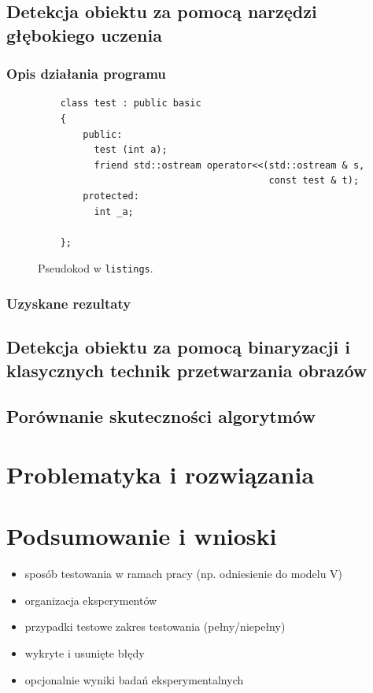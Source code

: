 \documentclass[a4paper,twoside,12pt]{book}
\begin{document}
\section{Detekcja obiektu za pomocą narzędzi głębokiego uczenia}
\subsection{Opis działania programu}
\begin{figure}
    \centering
    \begin{lstlisting}
    class test : public basic
    {
        public:
          test (int a);
          friend std::ostream operator<<(std::ostream & s, 
                                         const test & t);
        protected:
          int _a;  
          
    };
    \end{lstlisting}
    \caption{Pseudokod w \texttt{listings}.}
    \label{fig:pseudokod:listings}
    \end{figure}
\subsection{Uzyskane rezultaty}
\section{Detekcja obiektu za pomocą binaryzacji i klasycznych technik przetwarzania obrazów}
\section{Porównanie skuteczności algorytmów}

\chapter{Problematyka i rozwiązania}
\label{ch:06}
\chapter{Podsumowanie i wnioski}
\label{ch:07}
\begin{itemize}
\item sposób testowania w ramach pracy (np. odniesienie do modelu V)
\item organizacja eksperymentów
\item przypadki testowe zakres testowania (pełny/niepełny)
\item wykryte i usunięte błędy
\item opcjonalnie wyniki badań eksperymentalnych
\end{itemize}
\end{document}
